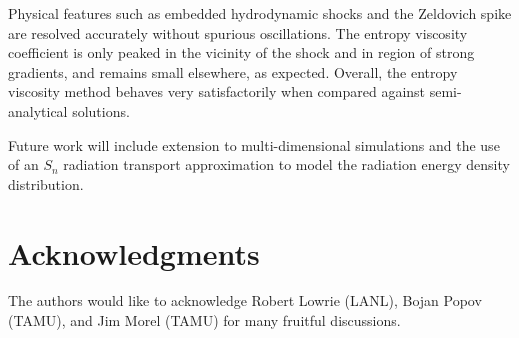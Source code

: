 \documentclass[times,doublespace]{fldauth}%
\begin{document}
Physical features such as embedded hydrodynamic shocks and the Zeldovich spike are resolved accurately without spurious oscillations. The entropy viscosity coefficient is only peaked in the vicinity of the shock and in region of strong gradients, and remains small elsewhere, as expected. Overall, the entropy viscosity method behaves very satisfactorily when compared against semi-analytical solutions.

%
Future work will include extension to multi-dimensional simulations and the use of an $S_n$ radiation transport approximation to model the radiation energy density distribution.

\section*{Acknowledgments}
The authors would like to acknowledge Robert Lowrie (LANL), Bojan Popov (TAMU), and Jim Morel (TAMU) for many fruitful discussions.

\appendix



\end{document}
